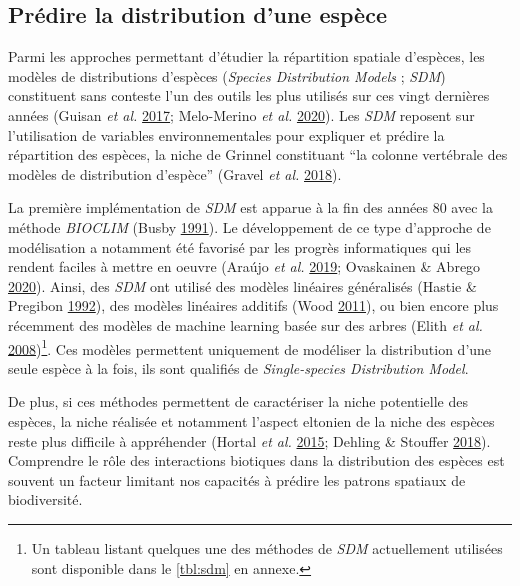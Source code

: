 \documentclass[12pt,]{article}
\begin{document}
\hypertarget{pruxe9dire-la-distribution-dune-espuxe8ce}{%
\subsection{Prédire la distribution d'une
espèce}\label{pruxe9dire-la-distribution-dune-espuxe8ce}}

Parmi les approches permettant d'étudier la répartition spatiale
d'espèces, les modèles de distributions d'espèces (\emph{Species
Distribution Models} ; \emph{SDM}) constituent sans conteste l'un des
outils les plus utilisés sur ces vingt dernières années (Guisan \emph{et
al.} \protect\hyperlink{ref-Guisan_2017}{2017}; Melo-Merino \emph{et
al.} \protect\hyperlink{ref-Melo_Merino_2020}{2020}). Les \emph{SDM}
reposent sur l'utilisation de variables environnementales pour expliquer
et prédire la répartition des espèces, la niche de Grinnel constituant
``la colonne vertébrale des modèles de distribution d'espèce'' (Gravel
\emph{et al.} \protect\hyperlink{ref-Gravel_2018}{2018}).

La première implémentation de \emph{SDM} est apparue à la fin des années
80 avec la méthode \emph{BIOCLIM} (Busby
\protect\hyperlink{ref-Busby_1991}{1991}). Le développement de ce type
d'approche de modélisation a notamment été favorisé par les progrès
informatiques qui les rendent faciles à mettre en oeuvre (Araújo
\emph{et al.} \protect\hyperlink{ref-Araujo_2019}{2019}; Ovaskainen \&
Abrego \protect\hyperlink{ref-Ovaskainen_2020}{2020}). Ainsi, des
\emph{SDM} ont utilisé des modèles linéaires généralisés (Hastie \&
Pregibon \protect\hyperlink{ref-Hastie_1992}{1992}), des modèles
linéaires additifs (Wood \protect\hyperlink{ref-Wood_2011}{2011}), ou
bien encore plus récemment des modèles de machine learning basée sur des
arbres (Elith \emph{et al.}
\protect\hyperlink{ref-Elith_2008}{2008})\footnote{Un tableau listant
  quelques une des méthodes de \emph{SDM} actuellement utilisées sont
  disponible dans le \cref{tbl:sdm} en annexe.}. Ces modèles permettent
uniquement de modéliser la distribution d'une seule espèce à la fois,
ils sont qualifiés de \emph{Single-species Distribution Model}.

De plus, si ces méthodes permettent de caractériser la niche potentielle
des espèces, la niche réalisée et notamment l'aspect eltonien de la
niche des espèces reste plus difficile à appréhender (Hortal \emph{et
al.} \protect\hyperlink{ref-Hortal_2015}{2015}; Dehling \& Stouffer
\protect\hyperlink{ref-Dehling_2018}{2018}). Comprendre le rôle des
interactions biotiques dans la distribution des espèces est souvent un
facteur limitant nos capacités à prédire les patrons spatiaux de
biodiversité.
\end{document}
